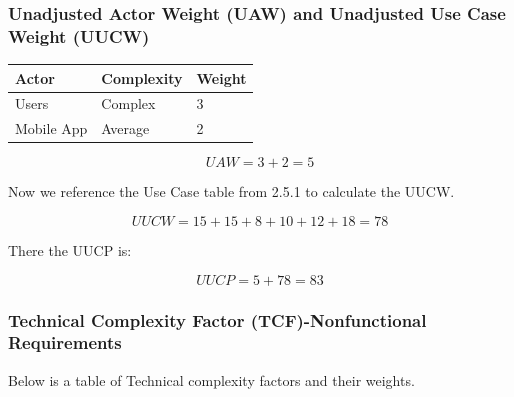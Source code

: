 \documentclass[letterpaper,english, 12pt]{scrreprt}
\begin{document}
\subsubsection{Unadjusted Actor Weight (UAW) and Unadjusted Use Case Weight (UUCW)}
\begin{center}
        \begin{tabular}{|C{3cm}|C{3cm}|C{3cm}|}
                \hline
                        Actor & Complexity & Weight \\
                \hline
                       Users & Complex & 3 \\
                \hline
                       Mobile App & Average & 2 \\
                \hline
        \end{tabular}
\end{center}

\begin{equation}
UAW = 3 + 2 = 5
\end{equation}

Now we reference the Use Case table from 2.5.1 to calculate the UUCW.

\begin{equation}
UUCW = 15 + 15 + 8 + 10 + 12 + 18 = 78
\end{equation}

There the UUCP is:

\begin{equation}
UUCP = 5 + 78 = 83
\end{equation}

\subsubsection{Technical Complexity Factor (TCF)-Nonfunctional Requirements}

Below is a table of Technical complexity factors and their weights.
\end{document}
